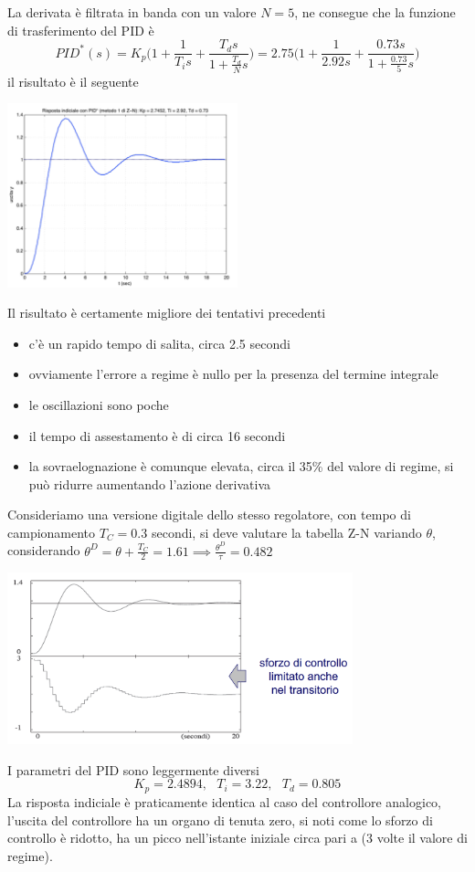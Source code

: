 \documentclass[10pt, letterpaper]{report}
\begin{document}
La derivata è filtrata in banda con un valore $N=5$, ne consegue che la funzione di trasferimento del PID è 
$$ PID^*(s)=
K_p\Big(1+\frac{1}{T_i s}+\dfrac{T_d s}{1+\frac{T_d}{N}s}\Big)= 
2.75\Big(1+\frac{1}{2.92 s}+\dfrac{0.73  s}{1+\frac{0.73 }{5}s}\Big)
$$
il risultato è il seguente
\begin{center}
    \includegraphics[width=0.5\textwidth]{images/ZN6.png}
\end{center}
Il risultato è certamente migliore dei tentativi precedenti \begin{itemize}
    \item c'è un rapido tempo di salita, circa 2.5 secondi 
    \item ovviamente l'errore a regime è nullo per la presenza del termine integrale 
    \item le oscillazioni sono poche 
    \item il tempo di assestamento è di circa 16 secondi 
    \item la sovraelognazione è comunque elevata, circa il 35\% del valore di regime, si può ridurre aumentando l'azione derivativa
\end{itemize}
Consideriamo una versione digitale dello stesso regolatore, con tempo di campionamento $T_C=0.3$ secondi, si deve valutare la tabella Z-N variando $\theta$, considerando $\theta^D=\theta + \frac{T_C}{2}=1.61\implies \frac{\theta^D}{\tau}=0.482$
\begin{center}
    \includegraphics[width=0.75\textwidth]{images/ZN7.png}
\end{center}
I parametri del PID sono leggermente diversi
$$ K_p=2.4894, \ \  \
T_i=3.22, \ \  \
T_d=0.805 $$
La risposta indiciale è praticamente identica al caso del controllore analogico, l'uscita del controllore ha un organo di tenuta zero, si noti come lo sforzo di controllo è ridotto, ha un picco nell'istante iniziale circa pari a  (3 volte il valore di regime).
\end{document}
